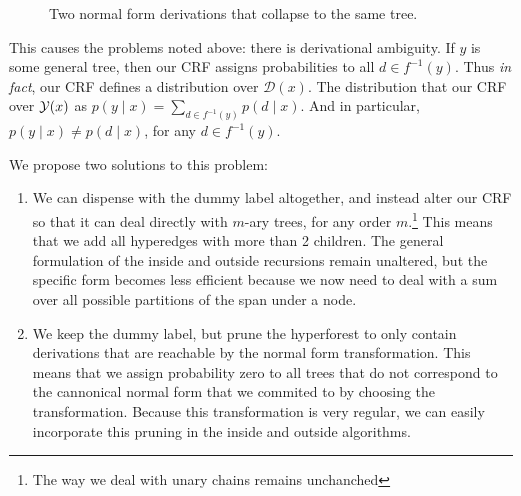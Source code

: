     \begin{figure}[h]
      \begin{subfigure}[b]{0.5\textwidth}
        \center
        \begin{tikzpicture}[scale=.8]
          
        \end{tikzpicture}
    	\end{subfigure}
    	\begin{subfigure}[b]{0.5\textwidth}
        \center
        \begin{tikzpicture}[scale=.8]
          
        \end{tikzpicture}
    	\end{subfigure}
      \caption{Two normal form derivations that collapse to the same tree.}
      \label{fig:normal-form-trees}
    \end{figure}

    This causes the problems noted above: there is derivational ambiguity. If $y$ is some general tree, then our CRF assigns probabilities to all $d \in f^{-1}(y)$. Thus \textit{in fact}, our CRF defines a distribution over $\mathcal{D}(x)$. The distribution that our CRF over $\yieldx$  as $p(y \mid x) = \sum_{d \in f^{-1}(y)} p(d \mid x)$. And in particular, $p(y \mid x) \neq p(d \mid x)$, for any $d \in f^{-1}(y)$.

    We propose two solutions to this problem:
    \begin{enumerate}
      \item We can dispense with the dummy label altogether, and instead alter our CRF so that it can deal directly with $m$-ary trees, for any order $m$.\footnote{The way we deal with unary chains remains unchanched} This means that we add all hyperedges with more than 2 children. The general formulation of the inside and outside recursions remain unaltered, but the specific form becomes less efficient because we now need to deal with a sum over all possible partitions of the span under a node.
      \item We keep the dummy label, but prune the hyperforest to only contain derivations that are reachable by the normal form transformation. This means that we assign probability zero to all trees that do not correspond to the cannonical normal form that we commited to by choosing the transformation. Because this transformation is very regular, we can easily incorporate this pruning in the inside and outside algorithms.
    \end{enumerate}

